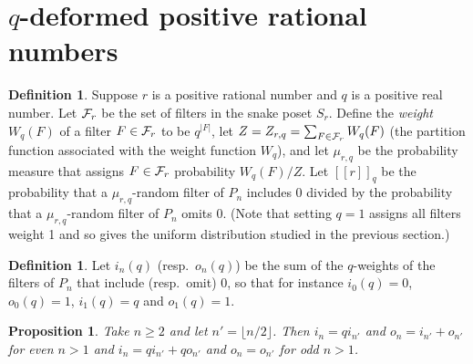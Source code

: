 \documentclass[12pt]{article}
\theoremstyle{plain}
\newtheorem{proposition}[theorem]{Proposition}
\theoremstyle{definition}
\newtheorem{definition}[theorem]{Definition}
\theoremstyle{remark}
\newcommand{\cF}{{\cal{F}}}
\newcommand{\llb}{[\![}
\newcommand{\rrb}{]\!]}
\begin{document}


\section{$q$-deformed positive rational numbers}
\label{sec:q}

\begin{definition}
Suppose $r$ is a positive rational number and $q$ is a positive real number.
Let $\cF_r$ be the set of filters in the snake poset $S_r$.
Define the {\em weight} $W_q(F)$ of a filter $F \in \cF_r$ to be $q^{|F|}$, 
let $Z = Z_{r,q} = \sum_{F \in \cF_r} W_q(F)$
(the partition function associated with the weight function $W_q$),
and let $\mu_{r,q}$ be the probability measure
that assigns $F \in \cF_r$ probability $W_q(F)/Z$.
Let $\llb r \rrb_q$ be
the probability that a $\mu_{r,q}$-random filter of $P_n$ includes 0 divided by
the probability that a $\mu_{r,q}$-random filter of $P_n$ omits 0.
(Note that setting $q=1$ assigns all filters weight 1
and so gives the uniform distribution studied in the previous section.)
\end{definition}

\begin{definition}
Let $i_n(q)$ (resp.\ $o_n(q)$) be 
the sum of the $q$-weights of the filters of $P_n$ 
that include (resp.\ omit) 0, so that for instance 
$i_0(q) = 0$, $o_0(q) = 1$, $i_1(q) = q$ and $o_1(q) = 1$.
\end{definition}

\begin{proposition}
Take $n \geq 2$ and let $n' = \lfloor n/2 \rfloor$. Then
$i_{n} = q i_{n'}$ and $o_{n} = i_{n'}+o_{n'}$ for even $n>1$ and
$i_{n} = q i_{n'} + q o_{n'}$ and $o_{n} = o_{n'}$ for odd $n>1$.
\label{prop:qrecur}
\end{proposition}
\end{document}

